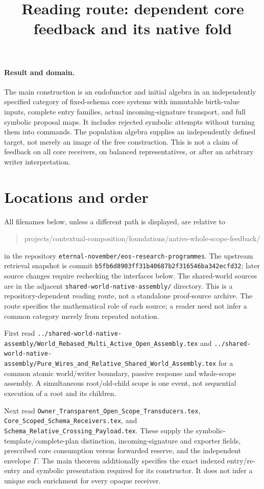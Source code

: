 \documentclass[11pt]{article}
\title{Reading route: dependent core feedback and its native fold}
\date{}
\begin{document}
\maketitle
\paragraph{Result and domain.}
The main construction is an endofunctor and initial algebra in an independently specified category of fixed-schema core systems with immutable birth-value inputs, complete entry families, actual incoming-signature transport, and full symbolic proposal maps. It includes rejected symbolic attempts without turning them into commands. The population algebra supplies an independently defined target, not merely an image of the free construction. This is not a claim of feedback on all core receivers, on balanced representatives, or after an arbitrary writer interpretation.

\section{Locations and order}
All filenames below, unless a different path is displayed, are relative to
\begin{quote}\ttfamily projects/contextual-composition/foundations/native-whole-scope-feedback/\end{quote}
in the repository \texttt{eternal-november/eos-research-programmes}. The upstream retrieval snapshot is commit \texttt{b5fb6d8903ff31b40687b2f316546ba342ecfd32}; later source changes require rechecking the interfaces below. The shared-world sources are in the adjacent \texttt{shared-world-native-assembly/} directory. This is a repository-dependent reading route, not a standalone proof-source archive. The route specifies the mathematical role of each source; a reader need not infer a common category merely from repeated notation.

First read \texttt{../shared-world-native-assembly/World\_Rebased\_Multi\_Active\_Open\_Assembly.tex} and \texttt{../shared-world-native-assembly/Pure\_Wires\_and\_Relative\_Shared\_World\_Assembly.tex} for a common atomic world/writer boundary, passive response and whole-scope assembly. A simultaneous root/old-child scope is one event, not sequential execution of a root and its children.

Next read \texttt{Owner\_Transparent\_Open\_Scope\_Transducers.tex}, \texttt{Core\_Scoped\_Schema\_Receivers.tex}, and \texttt{Schema\_Relative\_Crossing\_Payload.tex}. These supply the symbolic-template/complete-plan distinction, incoming-signature and exporter fields, prescribed core consumption versus forwarded reserve, and the independent envelope $\Gamma$. The main theorem additionally specifies the exact indexed entry/re-entry and symbolic presentation required for its constructor. It does not infer a unique such enrichment for every opaque receiver.
\end{document}
